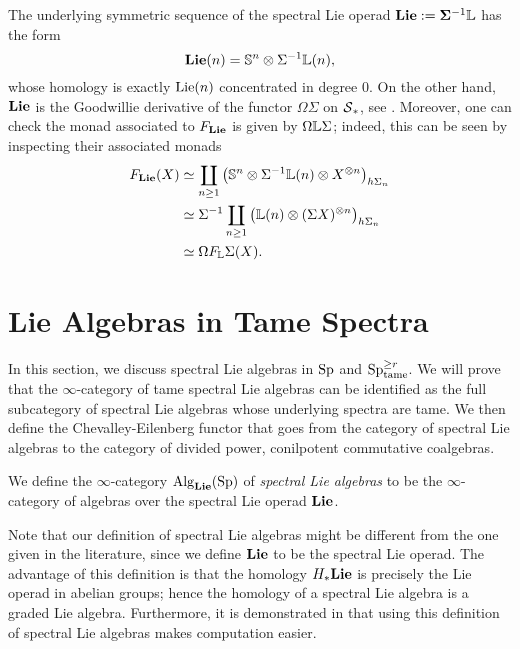 \begin{remark}
\label{Remark on shifted Lie operads}
The underlying symmetric sequence of the spectral Lie operad $\mathbf{Lie}:= \mathbf{\Sigma}^{-1}{\mathbb{L}}$
	has the form 	
	$$
	\mathbf{Lie}(n)= {\mathbb{S}}^{n} \otimes \Sigma^{-1} {\mathbb{L}}(n),
	$$
	whose homology is exactly $\operatorname{Lie}(n)$ concentrated in degree $0$.
	On the other hand, $\mathbf{Lie}$ is the Goodwillie derivative of the functor $\Omega\Sigma$ on $\operatorname{\mathcal{S}}_*$, see \cite[Section 8]{GoodwillieIII}.
	Moreover, one can check the monad associated to $F_{\mathbf{Lie}}$ is given by $\Omega{\mathbb{L}} \Sigma$; indeed, this can be seen by inspecting their associated monads
	\begin{align*}
		F_{\mathbf{Lie}}(X) &\simeq \coprod_{n\geq 1}
		\big(
		{\mathbb{S}}^{n} \otimes \Sigma^{-1}{\mathbb{L}}(n) 
		\otimes X^{\otimes n}
		\big)_{h\Sigma_n}\\
		& \simeq 
		\Sigma^{-1}
		\coprod_{n\geq 1}
		\big(
		{\mathbb{L}}(n) 
		\otimes (\Sigma X)^{\otimes n}
		\big)_{h\Sigma_n}\\
		& \simeq 
		\Omega F_{{\mathbb{L}}}\Sigma(X).
	\end{align*}	
\end{remark}






\section{Lie Algebras in Tame Spectra}

In this section, we discuss spectral Lie algebras in $\operatorname{Sp}$ and $\operatorname{Sp}^{\geq r}_{\operatorname{tame}}$. We will prove that the $\infty$-category of tame spectral Lie algebras can be identified as the full subcategory of spectral Lie algebras whose underlying spectra are tame.
We then define the Chevalley-Eilenberg functor that goes from the category of spectral Lie algebras to the category of divided power, conilpotent commutative coalgebras.


\begin{definition}
\label{Spectral Lie operad}
We define the $\infty$-category $\operatorname{Alg}_{\mathbf{Lie}}(\operatorname{Sp})$ of \emph{spectral Lie algebras} to be the $\infty$-category of algebras over the spectral Lie operad $\mathbf{Lie}$.
\end{definition}
Note that our definition of spectral Lie algebras might be different from the one given in the literature, since we define $\mathbf{Lie}$ to be the spectral Lie operad. 
The advantage of this definition is that the homology $H_{*}\mathbf{Lie}$ is precisely the Lie operad in abelian groups; hence the homology of a spectral Lie algebra is a graded Lie algebra. 
Furthermore, it is demonstrated in \cite{Camarena_mod2_free_spectral_Lie_algebra} that using this definition of spectral Lie algebras makes computation easier.

